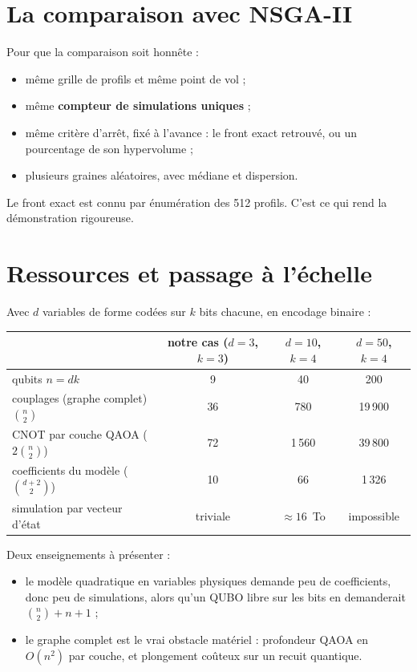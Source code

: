 \section{La comparaison avec NSGA-II}
Pour que la comparaison soit honnête :
\begin{itemize}
\item même grille de profils et même point de vol ;
\item même \textbf{compteur de simulations uniques} ;
\item même critère d'arrêt, fixé à l'avance : le front exact retrouvé, ou un pourcentage de son hypervolume ;
\item plusieurs graines aléatoires, avec médiane et dispersion.
\end{itemize}
Le front exact est connu par énumération des 512 profils. C'est ce qui rend la démonstration rigoureuse.

\section{Ressources et passage à l'échelle}
Avec $d$ variables de forme codées sur $k$ bits chacune, en encodage binaire :
\begin{center}
\begin{tabular}{lccc}
\toprule
& notre cas ($d=3$, $k=3$) & $d=10$, $k=4$ & $d=50$, $k=4$\\
\midrule
qubits $n=dk$ & 9 & 40 & 200\\
couplages (graphe complet) $\binom n2$ & 36 & 780 & 19\,900\\
CNOT par couche QAOA ($2\binom n2$) & 72 & 1\,560 & 39\,800\\
coefficients du modèle ($\binom{d+2}2$) & 10 & 66 & 1\,326\\
simulation par vecteur d'état & triviale & $\approx16$~To & impossible\\
\bottomrule
\end{tabular}
\end{center}
Deux enseignements à présenter :
\begin{itemize}
\item le modèle quadratique en variables physiques demande peu de coefficients, donc peu de simulations, alors qu'un QUBO libre sur les bits en demanderait $\binom n2+n+1$ ;
\item le graphe complet est le vrai obstacle matériel : profondeur QAOA en $O(n^2)$ par couche, et plongement coûteux sur un recuit quantique.
\end{itemize}

